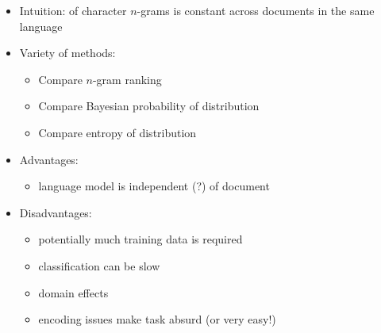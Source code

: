 \documentclass[a4paper,landscape,headrule,footrule,xetex]{foils}
\begin{document}
\begin{itemize}
\item Intuition:  of character $n$-grams is constant across documents in the same language
\item Variety of methods:
\begin{itemize}
\item Compare $n$-gram ranking %
\item Compare Bayesian probability of distribution %
\item Compare entropy of distribution %
\end{itemize}
\pagebreak
\item Advantages:
  \begin{itemize}
  \item language model is independent (?) of document
  \end{itemize}
\item Disadvantages:
  \begin{itemize}
  \item potentially much training data is required
  \item classification can be slow
  \item domain effects
  \item encoding issues make task absurd (or very easy!)
  \end{itemize}
\end{itemize}




\end{document}
